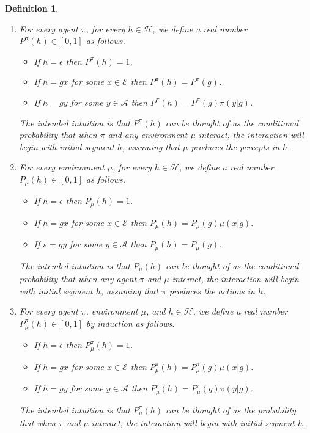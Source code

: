 \documentclass[twoside]{article}
\newtheorem{definition}[theorem]{Definition}
\begin{document}
\begin{definition}
\label{pullbackdef}
    \begin{enumerate}
        \item
        For every agent $\pi$, for every $h\in\mathcal H$, we define a real number
        $P^\pi(h)\in[0,1]$ as follows.
        \begin{itemize}
            \item
            If $h=\epsilon$ then $P^\pi(h)=1$.
            \item
            If $h=gx$ for some $x\in\mathcal E$ then $P^\pi(h)=P^\pi(g)$.
            \item
            If $h=gy$ for some $y\in\mathcal A$ then $P^\pi(h)=P^\pi(g)\pi(y|g)$.
        \end{itemize}
        The intended intuition is that $P^\pi(h)$ can be thought of as the
        conditional probability that when $\pi$
        and any environment
        $\mu$ interact, the interaction will begin with initial segment
        $h$, \emph{assuming}
        that $\mu$ produces the percepts in $h$.
        \item
        For every environment $\mu$, for every $h\in\mathcal H$, we define a real number
        $P_\mu(h)\in[0,1]$ as follows.
        \begin{itemize}
            \item
            If $h=\epsilon$ then $P_\mu(h)=1$.
            \item
            If $h=gx$ for some $x\in\mathcal E$ then $P_\mu(h)=P_\mu(g)\mu(x|g)$.
            \item
            If $s=gy$ for some $y\in\mathcal A$ then $P_\mu(h)=P_\mu(g)$.
        \end{itemize}
        The intended intuition is that $P_\mu(h)$ can be thought of as the
        conditional probability that when any agent $\pi$ and $\mu$ interact,
        the interaction will begin with initial segment $h$, \emph{assuming} that
        $\pi$ produces the actions in $h$.
        \item
        For every agent $\pi$, environment $\mu$, and $h\in\mathcal H$, we define a
        real number $P^\pi_\mu(h)\in[0,1]$ by induction as follows.
        \begin{itemize}
            \item
            If $h=\epsilon$ then $P^\pi_\mu(h)=1$.
            \item
            If $h=gx$ for some $x\in\mathcal E$ then
            $P^\pi_\mu(h)=P^\pi_\mu(g)\mu(x|g)$.
            \item
            If $h=gy$ for some $y\in\mathcal A$ then
            $P^\pi_\mu(h)=P^\pi_\mu(g)\pi(y|g)$.
        \end{itemize}
        The intended intuition is that $P^\pi_\mu(h)$ can be thought of as
        the probability that when $\pi$ and $\mu$ interact, the interaction
        will begin with initial segment $h$.
    \end{enumerate}
\end{definition}
\end{document}

